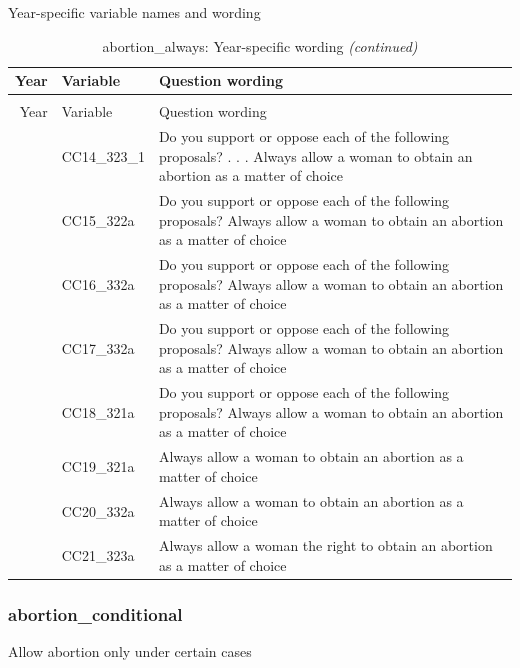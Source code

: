 \documentclass[
  12pt]{article}
\begin{document}
Year-specific variable names and
wording\begingroup\fontsize{11}{13}\selectfont

\begin{longtable}[t]{rl>{\raggedright\arraybackslash}p{10cm}}
\caption{\label{tab:unnamed-chunk-5}abortion\_always: Year-specific wording}\\
\toprule
Year & Variable & Question wording\\
\midrule
\endfirsthead
\caption[]{abortion\_always: Year-specific wording \textit{(continued)}}\\
\toprule
Year & Variable & Question wording\\
\midrule
\endhead

\endfoot
\bottomrule
\endlastfoot
2014 & CC14\_323\_1 & Do you support or oppose each of the following proposals? . . . Always allow a woman to obtain an abortion as a matter of choice\\
\addlinespace
2015 & CC15\_322a & Do you support or oppose each of the following proposals? Always allow a woman to obtain an abortion as a matter of choice\\
\addlinespace
2016 & CC16\_332a & Do you support or oppose each of the following proposals? Always allow a woman to obtain an abortion as a matter of choice\\
\addlinespace
2017 & CC17\_332a & Do you support or oppose each of the following proposals? Always allow a woman to obtain an abortion as a matter of choice\\
\addlinespace
2018 & CC18\_321a & Do you support or oppose each of the following proposals? Always allow a woman to obtain an abortion as a matter of choice\\
\addlinespace
2019 & CC19\_321a & Always allow a woman to obtain an abortion as a matter of choice\\
\addlinespace
2020 & CC20\_332a & Always allow a woman to obtain an abortion as a matter of choice\\
\addlinespace
2021 & CC21\_323a & Always allow a woman the right to obtain an abortion as a matter of choice\\*
\end{longtable}
\endgroup{}

\hypertarget{abortion_conditional}{%
\subsubsection{abortion\_conditional}\label{abortion_conditional}}

Allow abortion only under certain cases
\end{document}
